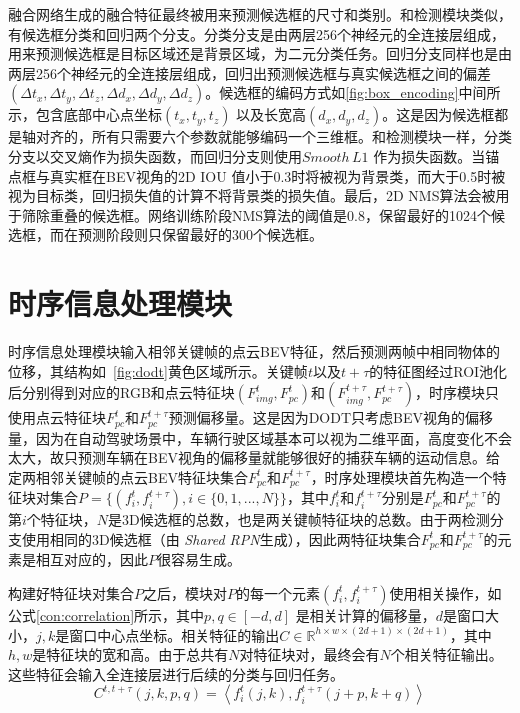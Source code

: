 融合网络生成的融合特征最终被用来预测候选框的尺寸和类别。和检测模块类似，有候选框分类和回归两个分支。分类分支是由两层256个神经元的全连接层组成，用来预测候选框是目标区域还是背景区域，为二元分类任务。回归分支同样也是由两层256个神经元的全连接层组成，回归出预测候选框与真实候选框之间的偏差 $(\Delta t_x,  \Delta t_y, \Delta t_z, \Delta d_x, \Delta d_y, \Delta d_z)$。候选框的编码方式如\figurename \ref{fig:box_encoding}中间所示，包含底部中心点坐标$(t_x, t_y, t_z)$ 以及长宽高$(d_x, d_y, d_z)$。这是因为候选框都是轴对齐的，所有只需要六个参数就能够编码一个三维框。和检测模块一样，分类分支以交叉熵作为损失函数，而回归分支则使用$Smooth \, L1$ 作为损失函数。当锚点框与真实框在BEV视角的2D IOU 值小于0.3时将被视为背景类，而大于0.5时被视为目标类，回归损失值的计算不将背景类的损失值。最后，2D NMS算法会被用于筛除重叠的候选框。网络训练阶段NMS算法的阈值是0.8，保留最好的1024个候选框，而在预测阶段则只保留最好的300个候选框。

\section{时序信息处理模块}
\label{temporal_module}

时序信息处理模块输入相邻关键帧的点云BEV特征，然后预测两帧中相同物体的位移，其结构如\figurename \, \ref{fig:dodt}黄色区域所示。关键帧$t$以及$t+\tau$的特征图经过ROI池化后分别得到对应的RGB和点云特征块$(F^t_{img}, F^t_{pc})$和$(F^{t+\tau}_{img}, F^{t+\tau}_{pc})$，时序模块只使用点云特征块$F^t_{pc}$和$F^{t+\tau}_{pc}$预测偏移量。这是因为DODT只考虑BEV视角的偏移量，因为在自动驾驶场景中，车辆行驶区域基本可以视为二维平面，高度变化不会太大，故只预测车辆在BEV视角的偏移量就能够很好的捕获车辆的运动信息。给定两相邻关键帧的点云BEV特征块集合$F^t_{pc}$和$F^{t+\tau}_{pc}$，时序处理模块首先构造一个特征块对集合$P = \{(f^t_i, f^{t+\tau}_i), i \in \{0, 1, ..., N\}\}$，其中$f^t_i$和$f^{t+\tau}_i$分别是$F^t_{pc}$和$F^{t+\tau}_{pc}$的第$i$个特征块，$N$是3D候选框的总数，也是两关键帧特征块的总数。由于两检测分支使用相同的3D候选框（由 \textit{Shared RPN}生成），因此两特征块集合$F^t_{pc}$和$F^{t+\tau}_{pc}$的元素是相互对应的，因此$P$很容易生成。

构建好特征块对集合$P$之后，模块对$P$的每一个元素$(f^t_i, f^{t+\tau}_i)$使用相关操作，如公式\ref{con:correlation}所示，其中$p,q \in [-d, d]$ 是相关计算的偏移量，$d$是窗口大小，$j,k$是窗口中心点坐标。相关特征的输出$C \in \mathbb{R}^{h \times w \times (2d+1) \times (2d+1)}$，其中 $h,w$是特征块的宽和高。由于总共有$N$对特征块对，最终会有$N$个相关特征输出。这些特征会输入全连接层进行后续的分类与回归任务。
\begin{equation}
C^{t,t+\tau}(j,k,p,q) = \left \langle f^t_i(j,k), f^{t+\tau}_i(j+p,k+q) \right \rangle
\label{con:correlation}
\end{equation}

